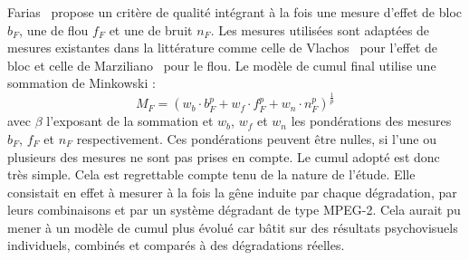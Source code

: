 Farias~\cite{farias-phd} propose un critère de qualité intégrant à la fois une mesure d'effet de bloc $b_F$, une de flou $f_F$ et une de bruit $n_F$. Les mesures utilisées sont adaptées de mesures existantes dans la littérature comme celle de Vlachos~\cite{vlachos-detection} pour l'effet de bloc et celle de Marziliano~\cite{marziliano-blurmetric, marziliano-ringingmetric} pour le flou. Le modèle de cumul final utilise une sommation de Minkowski :
\begin{equation}
M_F = \left( w_b\cdot b_F^p + w_f\cdot f_F^p + w_n\cdot n_F^p \right)^{\frac{1}{p}}
\end{equation}
%
avec $\beta$ l'exposant de la sommation et $w_b$, $w_f$ et $w_n$ les pondérations des mesures $b_F$, $f_F$ et $n_F$ respectivement. Ces pondérations peuvent être nulles, si l'une ou plusieurs des mesures ne sont pas prises en compte. Le cumul adopté est donc très simple. Cela est regrettable compte tenu de la nature de l'étude. Elle consistait en effet à mesurer à la fois la gêne induite par chaque dégradation, par leurs combinaisons et par un système dégradant de type MPEG-2. Cela aurait pu mener à un modèle de cumul plus évolué car bâtit sur des résultats psychovisuels individuels, combinés et comparés à des dégradations réelles.

